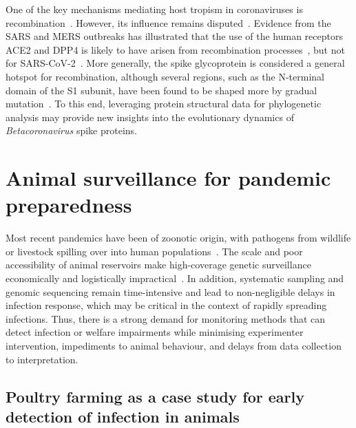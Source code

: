 One of the key mechanisms mediating host tropism in coronaviruses is recombination~\cite{bobay2020, turakhia2022}. However, its influence remains disputed~\cite{wells2023}. Evidence from the SARS and MERS outbreaks has illustrated that the use of the human receptors ACE2 and DPP4 is likely to have arisen from recombination processes~\cite{anthony2017, wells2021, wells2023}, but not for SARS-CoV-2~\cite{boni2020, wrobel2021, wells2021, starr2022, temmam2022, wells2023}. More generally, the spike glycoprotein is considered a general hotspot for recombination, although several regions, such as the N-terminal domain of the S1 subunit, have been found to be shaped more by gradual mutation~\cite{deklerk2022}. To this end, leveraging protein structural data for phylogenetic analysis may provide new insights into the evolutionary dynamics of \textit{Betacoronavirus} spike proteins.



\section{Animal surveillance for pandemic preparedness}
\label{sec:bkg_animal_welfare}

Most recent pandemics have been of zoonotic origin, with pathogens from wildlife or livestock spilling over into human populations~\cite{vora2022}. The scale and poor accessibility of animal reservoirs make high-coverage genetic surveillance economically and logistically impractical~\cite{tixier2009, astill2018, plowright2019, giles2021}. In addition, systematic sampling and genomic sequencing remain time-intensive and lead to non-negligible delays in infection response, which may be critical in the context of rapidly spreading infections. Thus, there is a strong demand for monitoring methods that can detect infection or welfare impairments while minimising experimenter intervention, impediments to animal behaviour, and delays from data collection to interpretation.

\subsection{Poultry farming as a case study for early detection of infection in animals}

